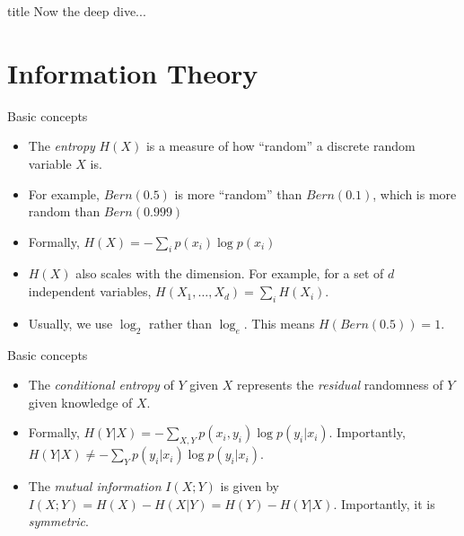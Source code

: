\documentclass{beamer}
\begin{document}
\begin{frame}
	\vfill
\centering
\begin{beamercolorbox}[sep=8pt,center,shadow=true,rounded=true]{title}
	Now the deep dive... 
	\par%
\end{beamercolorbox}
\vfill
\end{frame}

\section{Information Theory}
\begin{frame}{Basic concepts}
\begin{itemize}
	\item The \emph{entropy} $H(X)$ is a measure of how ``random'' a discrete random variable $X$ is. 
	\item For example, $Bern(0.5)$ is more ``random'' than $Bern(0.1)$, which is more random than $Bern(0.999)$
	\item Formally, $H(X)=-\sum_i p(x_i) \log p(x_i)$ 
	\item $H(X)$ also scales with the dimension. For example, for a set of $d$ independent variables, $H(X_1, \ldots, X_d)=\sum_i H(X_i)$. 
	\item Usually, we use $\log_2$ rather than $\log_e$. This means $H(Bern(0.5))=1$. 
\end{itemize}
\end{frame}

\begin{frame}{Basic concepts}
\begin{itemize}
	\item The \emph{conditional entropy} of $Y$ given $X$ represents the \emph{residual} randomness of $Y$ given knowledge of $X$. 
	\item Formally, $H(Y|X)= -\sum_{X,Y} p(x_i,y_i) \log p(y_i | x_i)$. Importantly,  $H(Y|X) \neq -\sum_{Y} p(y_i|x_i) \log p(y_i | x_i)$.
	\item The \emph{mutual information} $I(X;Y)$ is given by
	$I(X;Y) = H(X) - H(X|Y) = H(Y) - H(Y|X)$. Importantly, it is \emph{symmetric}. 
\end{itemize}
\end{frame}
\end{document}

